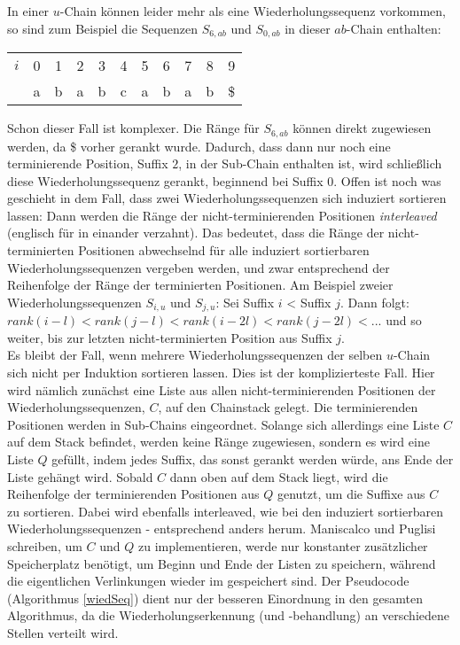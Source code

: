 In einer $u$-Chain können leider mehr als eine Wiederholungssequenz vorkommen, so sind zum Beispiel die Sequenzen $S_{6, ab}$ und $S_{0, ab}$ in dieser $ab$-Chain enthalten:
\begin{center}
\begin{tabular}{c c c c c c c c c c c}
$i$ & 0 & 1 & 2 & 3 & 4 & 5 & 6 & 7 & 8 & 9\\
 & a & b & a & b & \cellcolor{black!20!white}c & a & b & a & b & \cellcolor{black!20!white}\$\\
\end{tabular}
\end{center}

Schon dieser Fall ist komplexer. Die Ränge für $S_{6,ab}$ können direkt zugewiesen werden, da \$ vorher gerankt wurde. Dadurch, dass dann nur noch eine terminierende Position, Suffix $2$, in der Sub-Chain enthalten ist, wird schließlich diese Wiederholungssequenz gerankt, beginnend bei Suffix $0$.
Offen ist noch was geschieht in dem Fall, dass zwei Wiederholungssequenzen sich induziert sortieren lassen: Dann werden die Ränge der nicht-terminierenden Positionen \textit{interleaved} (englisch für \glqq in einander verzahnt\grqq{}). Das bedeutet, dass die Ränge der nicht-terminierten Positionen abwechselnd für alle induziert sortierbaren Wiederholungssequenzen vergeben werden, und zwar entsprechend der Reihenfolge der Ränge der terminierten Positionen. Am Beispiel zweier Wiederholungssequenzen $S_{i,u}$ und $S_{j,u}$: Sei Suffix $i$ < Suffix $j$. Dann folgt: $rank(i-l) < rank(j-l) < rank(i-2l) < rank(j-2l) < ...$ und so weiter, bis zur letzten nicht-terminierten Position aus Suffix $j$.\\
Es bleibt der Fall, wenn mehrere Wiederholungssequenzen der selben $u$-Chain sich nicht per Induktion sortieren lassen. Dies ist der komplizierteste Fall. Hier wird nämlich zunächst eine Liste aus allen nicht-terminierenden Positionen der Wiederholungssequenzen, $C$, auf den Chainstack gelegt. Die terminierenden Positionen werden in Sub-Chains eingeordnet. Solange sich allerdings eine Liste $C$ auf dem Stack befindet, werden keine Ränge zugewiesen, sondern es wird eine Liste $Q$ gefüllt, indem jedes Suffix, das sonst gerankt werden würde, ans Ende der Liste gehängt wird. Sobald $C$ dann oben auf dem Stack liegt, wird die Reihenfolge der terminierenden Positionen aus $Q$ genutzt, um die Suffixe aus $C$ zu sortieren. Dabei wird ebenfalls interleaved, wie bei den induziert sortierbaren Wiederholungssequenzen - entsprechend anders herum. Maniscalco und Puglisi schreiben, um $C$ und $Q$ zu implementieren, werde nur konstanter zusätzlicher Speicherplatz benötigt, um Beginn und Ende der Listen zu speichern, während die eigentlichen Verlinkungen wieder im \isa gespeichert sind. Der Pseudocode (Algorithmus \ref{wiedSeq}) dient nur der besseren Einordnung in den gesamten Algorithmus, da die Wiederholungserkennung (und -behandlung) an verschiedene Stellen verteilt wird.

